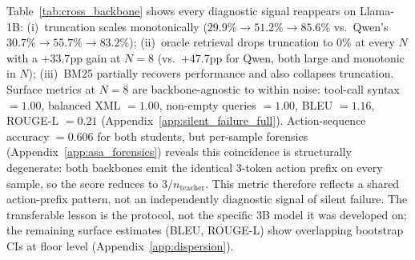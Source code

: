 Table~\ref{tab:cross_backbone} shows every diagnostic signal reappears on Llama-1B: (i)~truncation scales monotonically ($29.9\%\!\to\!51.2\%\!\to\!85.6\%$ vs.\ Qwen's $30.7\%\!\to\!55.7\%\!\to\!83.2\%$); (ii)~oracle retrieval drops truncation to $0\%$ at every $N$ with a $+33.7$pp gain at $N\!=\!8$ (vs.\ $+47.7$pp for Qwen, both large and monotonic in $N$); (iii)~BM25 partially recovers performance and also collapses truncation. Surface metrics at $N\!=\!8$ are backbone-agnostic to within noise: tool-call syntax $=1.00$, balanced XML $=1.00$, non-empty queries $=1.00$, BLEU $=1.16$, ROUGE-L $=0.21$ (Appendix~\ref{app:silent_failure_full}). Action-sequence accuracy $=0.606$ for both students, but per-sample forensics (Appendix~\ref{app:asa_forensics}) reveals this coincidence is structurally degenerate: both backbones emit the identical 3-token action prefix on every sample, so the score reduces to $3/n_\text{teacher}$. This metric therefore reflects a shared action-prefix pattern, not an independently diagnostic signal of silent failure. The transferable lesson is the protocol, not the specific 3B model it was developed on; the remaining surface estimates (BLEU, ROUGE-L) show overlapping bootstrap CIs at floor level (Appendix~\ref{app:dispersion}).
